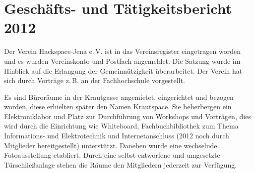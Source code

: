 \documentclass[10pt, a4paper]{scrartcl}
\begin{document}
\section*{Geschäfts- und Tätigkeitsbericht 2012}
Der Verein Hackspace-Jena e.\,V. ist in das Vereinsregister eingetragen worden und
es wurden Vereinskonto und Postfach angemeldet.
Die Satzung wurde im Hinblick auf die Erlangung der Gemeinnützigkeit überarbeitet.
Der Verein hat sich durch Vorträge z.\,B. an der Fachhochschule vorgestellt.

Es sind Büroräume in der Krautgasse angemietet, eingerichtet und bezogen worden,
diese erhielten später den Namen Krautspace.
Sie beherbergen ein Elektroniklabor und Platz zur Durchführung von Workshops und Vorträgen,
dies wird durch die Einrichtung wie Whiteboard,
Fachbuchbibliothek zum Thema Informations- und Elektrotechnik und Internetanschluss (2012 noch durch Mitglieder bereitgestellt) unterstützt.
Daneben wurde eine wechselnde Fotoausstellung etabliert.
Durch eine selbst entworfene und umgesetzte Türschließanlage stehen die Räume den Mitgliedern jederzeit zur Verfügung. 
\end{document}
